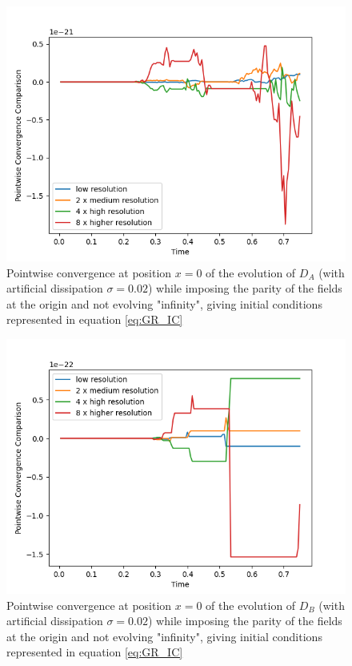\begin{figure}[H]
    \centering
    \includegraphics[width=0.9\columnwidth]{Images/DA-point.png}
    \caption{Pointwise convergence at position $x = 0$ of the evolution of $D_A$ (with artificial dissipation $\sigma = 0.02$) while imposing the parity of the fields at the origin and not evolving "infinity", giving initial conditions represented in equation \ref{eq:GR_IC}}
    \label{fig:point_DA}
\end{figure}

\newpage

\begin{figure}[H]
    \centering
    \includegraphics[width=0.9\columnwidth]{Images/DB-point.png}
    \caption{Pointwise convergence at position $x = 0$ of the evolution of $D_B$ (with artificial dissipation $\sigma = 0.02$) while imposing the parity of the fields at the origin and not evolving "infinity", giving initial conditions represented in equation \ref{eq:GR_IC}}
    \label{fig:point_DB}
\end{figure}

